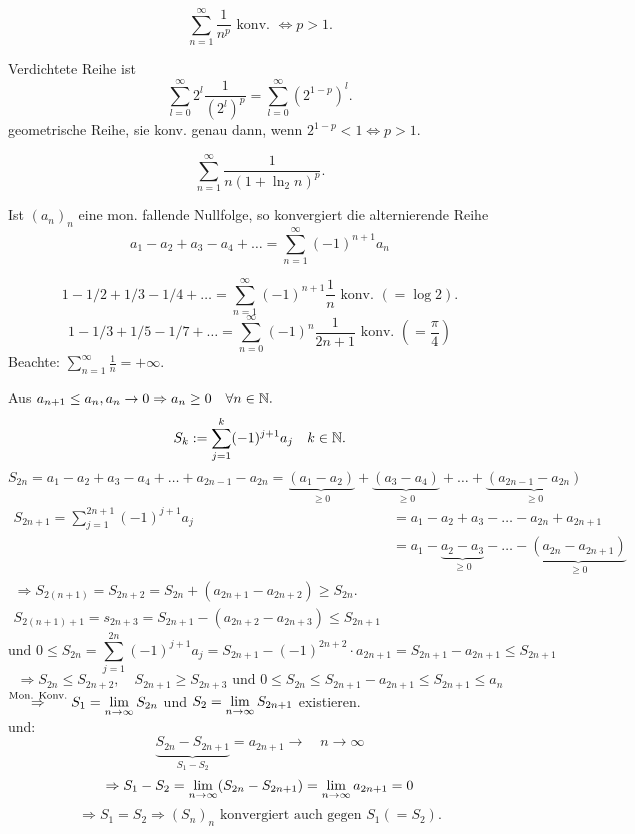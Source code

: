 \begin{bsp}
	\[ \sum_{n=1}^{\infty} \frac{1}{n^p} \text{ konv. } \Leftrightarrow p>1. \]
\end{bsp}
\begin{bew}
	Verdichtete Reihe ist 
	\[ \sum_{l=0}^{\infty}2^l \frac{1}{(2^l)^p} = \sum_{l=0}^{\infty} (2^{1-p})^l. \]
	geometrische Reihe, sie konv. genau dann, wenn \( 2^{1-p} < 1 \Leftrightarrow p>1. \)
\end{bew}
\begin{bsp}
	\[ \sum_{n=1}^{\infty} \frac{1}{n(1+\ln_2 n )^p}.\]
\end{bsp}
\begin{satz}[Leibniz]
	Ist \( (a_n)_n \) eine mon. fallende Nullfolge, so konvergiert die alternierende Reihe
	\[ a_1 - a_2 + a_3 - a_4 + \dots = \sum_{n=1}^{\infty} (-1)^{n+1} a_n \]
\end{satz}
\begin{bsp}
	\[ 1 - 1/2 + 1/3 - 1/4 + \dots = \sum_{n=1}^{\infty}(-1)^{n+1}\frac{1}{n} \text{ konv. } (=\log 2). \]
	\[ 1 - 1/3 + 1/5 - 1/7 + \dots = \sum_{n=0}^{\infty}(-1)^n \frac{1}{2n+1} \text{ konv. } (=\frac{\pi}{4}) \]
	Beachte: \( \sum_{n=1}^{\infty}\frac{1}{n} = +\infty \).
\end{bsp}
\begin{bew}
	Aus \( a_{n+1} \leq a_n, a_n \rightarrow 0 \Rightarrow a_n \geq 0 \quad\forall n\in\mathbb{N}. \)
	\[ S_k := \sum_{j=1}^{k} (-1)^{j+1} a_j \quad k\in\mathbb{N}. \]
	\[S_{2n} = a_1 - a_2 + a_3 - a_4 + \dots + a_{2n-1} - a_{2n} = \underbrace{(a_1 - a_2)}_{\geq 0} + \underbrace{(a_3 - a_4)}_{\geq 0} + \dots + \underbrace{(a_{2n-1} - a_{2n})}_{\geq 0} \]
	\begin{align*}
		S_{2n+1} = \sum_{j=1}^{2n+1}(-1)^{j+1}a_j &= a_1 - a_2 + a_3 - \dots - a_{2n} + a_{2n+1}\\
		&= a_1 - \underbrace{a_2 - a_3}_{\geq 0} - \dots - \underbrace{(a_{2n} - a_{2n+1})}_{\geq 0}\\
		\Rightarrow S_{2(n+1)} = S_{2n+2} = S_{2n} + (a_{2n+1} - a_{2n+2}) \geq S_{2n}.\\
		S_{2(n+1)+1} = s_{2n+3} = S_{2n+1} - (a_{2n+2} - a_{2n+3}) \leq S_{2n+1}
	\end{align*}
	\[ \text{und } 0 \leq S_{2n} = \sum_{j=1}^{2n} (-1)^{j+1} a_j = S_{2n+1} - (-1)^{2n+2} \cdot a_{2n+1} = S_{2n+1} - a_{2n+1} \leq S_{2n+1}\]
	\[\Rightarrow S_{2n} \leq S_{2n+2}, \quad S_{2n+1} \geq S_{2n+3} \text{ und } 0 \leq S_{2n} \leq S_{2n+1} - a_{2n+1} \leq S_{2n+1} \leq a_n\]
	\( \overset{\text{Mon. Konv.}}{\Rightarrow} S_1 = \lim\limits_{n\rightarrow\infty}S_{2n} \) und \( S_2 = \lim\limits_{n\rightarrow\infty}S_{2n+1} \) existieren.\\	
	und: 
	\[ \underbrace{S_{2n} - S_{2n+1}}_{S_1 - S_2} = a_{2n+1} \rightarrow \quad n\rightarrow \infty \]
	\[ \Rightarrow S_1 - S_2 = \lim\limits_{n\rightarrow\infty}(S_{2n} - S_{2n+1}) = \lim\limits_{n\rightarrow\infty}a_{2n+1} = 0 \]
	\[ \Rightarrow S_1 = S_2 \Rightarrow (S_n)_n \text{ konvergiert auch gegen } S_1 (=S_2). \]
\end{bew}
